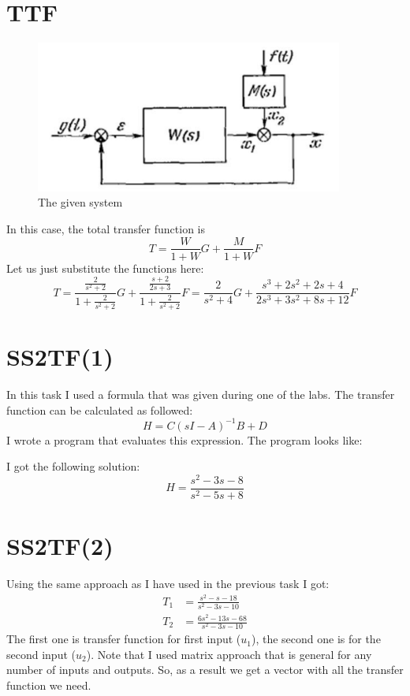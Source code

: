 \documentclass{article}
\begin{document}
\section{TTF}
\begin{figure}[H]
        \centering
        \includegraphics[width=0.9\textwidth]{sources/image3_1.png}
        \caption{The given system}
        \label{fig:bode1}
\end{figure}
In this case, the total transfer function is 
\begin{equation}
	T = \frac{W}{1+W}G + \frac{M}{1+W}F
\end{equation}
Let us just substitute the functions here:
\begin{equation}
	T = \frac{\frac{2}{s^2 + 2}}{1 + \frac{2}{s^2+2}} G + \frac{\frac{s + 2}{2s + 3}}{1 + \frac{2}{s^2 + 2}} F = 
	\frac{2}{s^2 + 4} G + \frac{s^3 + 2s^2 + 2s + 4}{2s^3 + 3s^2 + 8s + 12} F
\end{equation}
\section{SS2TF(1)}
In this task I used a formula that was given during one of the labs.
The transfer function can be calculated as followed:
\begin{equation}
	H = C (sI - A) ^{-1} B + D
\end{equation}
I wrote a program that evaluates this expression.
The program looks like:

I got the following solution:
\begin{equation}
	H = \frac{s^2 - 3s - 8}{s ^ 2 - 5s + 8}
\end{equation}
\section{SS2TF(2)}
Using the same approach as I have used in the previous task I got:
\begin{align}
	T_1 &= \frac{s^2 - s - 18}{s^2 - 3s - 10}\\
	T_2 &= \frac{6s^2 - 13s - 68}{s^2 - 3s - 10}
\end{align}
The first one is transfer function for first input ($u_1$), the second one is for the second input ($u_2$).
Note that I used matrix approach that is general for any number of inputs and outputs. So, as a result we get a vector with all the transfer function we need. 
\end{document}
